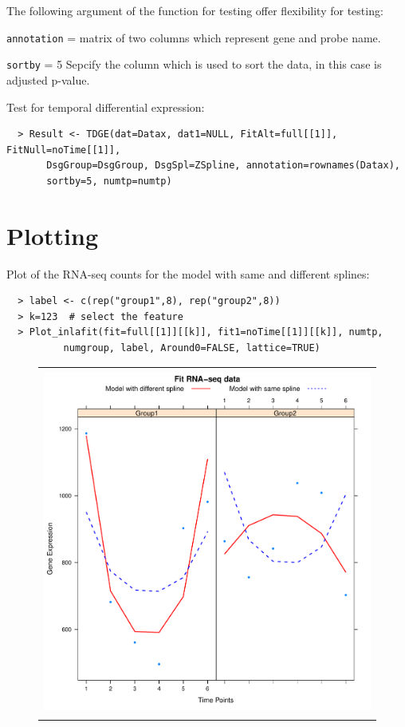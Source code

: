 \documentclass[a4paper]{article}
\begin{document}
The following argument of the function for testing offer flexibility for testing:
\begin{compactitem}
\item {\tt annotation} = matrix of two columns which represent gene and probe name. 
\item {\tt sortby} = 5 
Sepcify the column which is used to sort the data, in this case is adjusted p-value. 
\end{compactitem}
Test for temporal differential expression:

\begin{verbatim}
  > Result <- TDGE(dat=Datax, dat1=NULL, FitAlt=full[[1]], FitNull=noTime[[1]],
       DsgGroup=DsgGroup, DsgSpl=ZSpline, annotation=rownames(Datax), 
       sortby=5, numtp=numtp)
\end{verbatim}

\section{Plotting}
Plot of the RNA-seq counts for the model with same and different splines:
\begin{verbatim}
  > label <- c(rep("group1",8), rep("group2",8))
  > k=123  # select the feature
  > Plot_inlafit(fit=full[[1]][[k]], fit1=noTime[[1]][[k]], numtp,
          numgroup, label, Around0=FALSE, lattice=TRUE)
\end{verbatim}

\begin{figure}[h!]
\centering
\begin{tabular}{c}
\includegraphics[width=4.5in, height=4.5in]{Figure8.pdf}
\end{tabular}
\label{fig:sameDiffSpl}
\end{figure}
\end{document}
